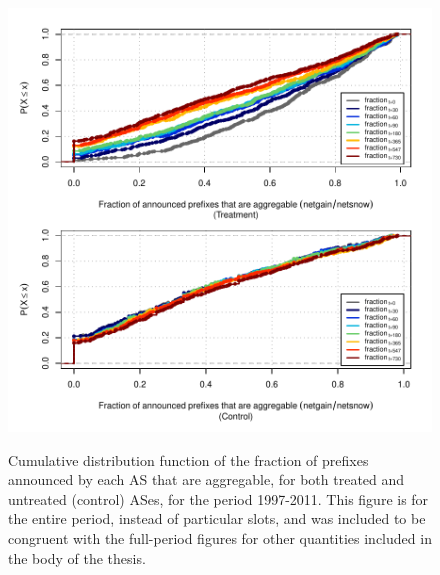 \begin{figure}[H]
\begin{centering}
\begin{singlespace}
\captionsetup{list=no}
    \includegraphics[width=6in]{figures/behavior-frac_deagg-1997_2011-corr.pdf}
    \vspace{-2em}\\
    \caption{Cumulative distribution function of the fraction of prefixes
    announced by each AS that are aggregable, for both treated and untreated
    (control) ASes, for the period 1997-2011. This figure is for the entire
    period, instead of particular slots, and was included to be congruent with
    the full-period figures for other quantities included in the body of the
    thesis.}
\end{singlespace}
\end{centering}
\end{figure}


